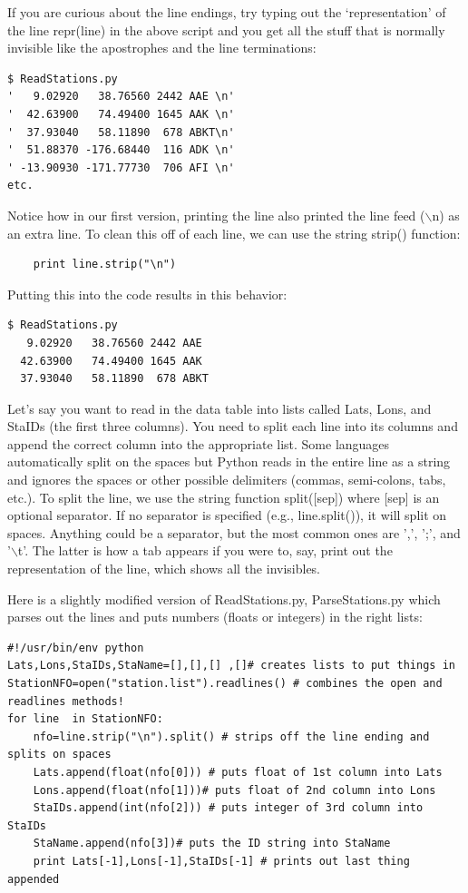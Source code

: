 \documentclass[11pt]{book}
\begin{document}
{{{{If you are curious about the line endings, try typing out the `representation' of the line {\color{blue}repr(line)} in the above script and you get all the  stuff that is normally  invisible like the apostrophes and the line terminations:

{ \color{blue} \begin{verbatim}
$ ReadStations.py
'   9.02920   38.76560 2442 AAE \n'
'  42.63900   74.49400 1645 AAK \n'
'  37.93040   58.11890  678 ABKT\n'
'  51.88370 -176.68440  116 ADK \n'
' -13.90930 -171.77730  706 AFI \n'
etc.
\end{verbatim}}


\noindent Notice how in our first version, printing the line also printed the line feed ($\backslash$n) as an extra line.  To clean this off of each line, we can use the  string {\color{blue}strip()} function:

{ \color{blue} \begin{verbatim}
    print line.strip("\n")
\end{verbatim}}

\noindent Putting this into the code results in this behavior:

{ \color{blue} \begin{verbatim}
$ ReadStations.py
   9.02920   38.76560 2442 AAE
  42.63900   74.49400 1645 AAK
  37.93040   58.11890  678 ABKT
\end{verbatim}}


Let's say you want to read in the data table into lists called Lats, Lons, and StaIDs (the first three columns).  You need to split each line into its columns and append the correct column into the appropriate list.  Some languages automatically split on the spaces  but Python reads in the entire line as a string and ignores the spaces or other possible delimiters (commas, semi-colons, tabs, etc.).  To split the line, we use the string function {\color{blue}split([sep])} where {\color{blue}[sep]} is an optional separator.  If no separator is specified (e.g., {\color{blue}line.split()}), it will split on spaces.   Anything could be a separator, but the most common ones are ',', ';', and '$\backslash$t'.  The latter is how a tab appears if you were to, say, print out the representation of the line, which shows all the invisibles.

Here is a slightly modified version of {\color{blue}ReadStations.py}, {\color{blue}ParseStations.py} which parses out the lines and puts numbers (floats or integers) in the right lists:

{ \color{blue} \begin{verbatim}
#!/usr/bin/env python
Lats,Lons,StaIDs,StaName=[],[],[] ,[]# creates lists to put things in
StationNFO=open("station.list").readlines() # combines the open and readlines methods!
for line  in StationNFO:
    nfo=line.strip("\n").split() # strips off the line ending and splits on spaces
    Lats.append(float(nfo[0])) # puts float of 1st column into Lats
    Lons.append(float(nfo[1]))# puts float of 2nd column into Lons
    StaIDs.append(int(nfo[2])) # puts integer of 3rd column into StaIDs
    StaName.append(nfo[3])# puts the ID string into StaName
    print Lats[-1],Lons[-1],StaIDs[-1] # prints out last thing appended
\end{verbatim}}

}}}}
\end{document}
